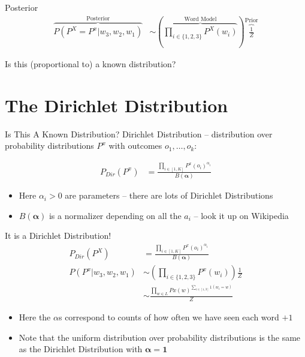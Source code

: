 \documentclass[11pt]{beamer}
\begin{document}
	\begin{frame}{Posterior}		
		\begin{align*}
			\overbrace{P(P^X = P^x \vert w_3,w_2,w_1)}^{\text{Posterior}} & \sim \left(\overbrace{\prod_{i \in \{1,2,3\}} P^{X}(w_i)}^{\text{Word Model}}\right) \overbrace{\frac{1}{Z}}^{\text{Prior}}
		\end{align*}
		
		\vspace{10pt} Is this (proportional to) a known distribution?
	\end{frame}
	
	\section{The Dirichlet Distribution}
	
	\begin{frame}{Is This A Known Distribution?}
		Dirichlet Distribution -- distribution over probability distributions $P^x$ with outcomes $o_1,\dots,o_k$:
		
		\begin{align*}
			P_{Dir}(P^x) & = \frac{\prod_{i \in [1,K]} P^{x}(o_i)^{\alpha_i}}{B(\boldsymbol{\alpha})}
		\end{align*}
		
		\vspace{10pt} \begin{itemize}
			\item Here	$\alpha_i > 0$ are parameters -- there are lots of Dirichlet Distributions
			\item $B(\boldsymbol{\alpha})$ is a normalizer depending on all the $a_i$ -- look it up on Wikipedia
		\end{itemize}
	\end{frame}
	
	\begin{frame}{It is a Dirichlet Distribution!}
		\begin{align*}
			P_{Dir}(P^X) & = \frac{\prod_{i \in [1,K]} P^{x}(o_i)^{\alpha_i}}{B(\boldsymbol{\alpha})} \\
			P(P^x \vert w_3,w_2,w_1) & \sim \left(\prod_{i \in \{1,2,3\}} P^{x}(w_i)\right) \frac{1}{Z} \\
			& \sim \frac{\prod_{w \in L} P{x}(w)^{\sum_{i \in [1,3]} 1(w_i = w)}}{Z}
		\end{align*}
		
		\vspace{10pt}\begin{itemize}
			\item Here the $\alpha$s correspond to counts of how often we have seen each word $+1$
			\item Note that the uniform distribution over probability distributions is the same as the Dirichlet Distribution with $\boldsymbol{\alpha} = \boldsymbol{1}$ 
		\end{itemize}
	\end{frame}
	
\end{document}
